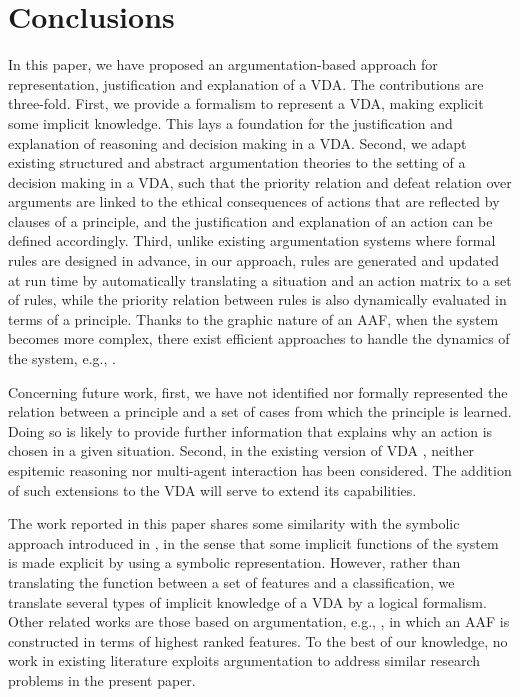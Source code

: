 \documentclass[letterpaper]{article} %
\begin{document}



\section{Conclusions}
In this paper, we have proposed an argumentation-based approach for representation, justification and explanation of a VDA. The contributions are three-fold. First, we provide a formalism to represent a VDA, making explicit some implicit knowledge. This lays a foundation for the justification and explanation of reasoning and decision making in a VDA. Second, we adapt existing structured and abstract argumentation theories to the setting of a decision making in a VDA, such that the priority relation and defeat relation over arguments are linked to the ethical consequences of actions that are reflected by clauses of a principle, and the justification and explanation of an action can be defined accordingly. Third, unlike existing argumentation systems where formal rules are designed in advance, in our approach, rules are generated and updated at run time by automatically translating a situation and an action matrix to a set of rules, while the priority relation between rules is also dynamically evaluated in terms of a principle. Thanks to the graphic nature of an AAF, when the system becomes more complex, there exist efficient approaches to handle the dynamics of the system, e.g., \cite{DBLP:journals/ai/LiaoJK11,DBLP:books/daglib/0033440}.

Concerning future work, first, we have not identified nor formally represented the relation between a principle and a set of cases from which the principle is learned. Doing so is likely to provide further information that explains why an action is chosen in a given situation. Second, in the existing version of VDA \cite{DBLP:journals/pieee/Anderson19}, neither espitemic reasoning nor multi-agent interaction \cite{DBLP:conf/agents/BroersenDHHT01,DBLP:journals/ai/AtkinsonB18,handbooknms} has been considered. The addition of such extensions to the VDA will serve to extend its capabilities.

The work reported in this paper shares some similarity with the symbolic approach introduced in \cite{DBLP:conf/ijcai/ShihCD18}, in the sense that some implicit functions of the system is made explicit by using a symbolic representation. However, rather than translating the function between a set of features and a classification, we translate several types of implicit knowledge of a VDA by a logical formalism. Other related works are those based on argumentation, e.g., \cite{Cocarascu2018}, in which an AAF is constructed in terms of highest ranked features. To the best of our knowledge, no work in existing literature exploits argumentation to address similar research problems in the present paper. 
\end{document}
